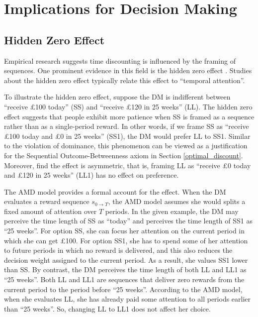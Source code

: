 \documentclass[
  12pt,
]{article}
\begin{document}
\hypertarget{implications-for-decision-making}{%
\section{Implications for Decision
Making}\label{implications-for-decision-making}}

\hypertarget{hidden-zero-effect}{%
\subsection{\texorpdfstring{Hidden Zero Effect
\label{hidden_zero_effect}}{Hidden Zero Effect }}\label{hidden-zero-effect}}

Empirical research suggests time discounting is influenced by the
framing of sequences. One prominent evidence in this field is the hidden
zero effect \citep{magen2008hidden, radu2011mechanism, read2017value}.
Studies about the hidden zero effect typically relate this effect to
``temporal attention''.

To illustrate the hidden zero effect, suppose the DM is indifferent
between ``receive £100 today'' (SS) and ``receive £120 in 25 weeks''
(LL). The hidden zero effect suggests that people exhibit more patience
when SS is framed as a sequence rather than as a single-period reward.
In other words, if we frame SS as ``receive £100 today and £0 in 25
weeks'' (SS1), the DM would prefer LL to SS1. Similar to the violation
of dominance, this phenomenon can be viewed as a justification for the
Sequential Outcome-Betweenness axiom in Section \ref{optimal_discount}.
Moreover, \citet{read2017value} find the effect is asymmetric, that is,
framing LL as ``receive £0 today and £120 in 25 weeks'' (LL1) has no
effect on preference.

The AMD model provides a formal account for the effect. When the DM
evaluates a reward sequence \(s_{0\rightarrow T}\), the AMD model
assumes she would splits a fixed amount of attention over \(T\) periods.
In the given example, the DM may perceive the time length of SS as
``today'' and perceives the time length of SS1 as ``25 weeks''. For
option SS, she can focus her attention on the current period in which
she can get £100. For option SS1, she has to spend some of her attention
to future periods in which no reward is delivered, and this also reduces
the decision weight assigned to the current period. As a result, she
values SS1 lower than SS. By contrast, the DM perceives the time length
of both LL and LL1 as ``25 weeks''. Both LL and LL1 are sequences that
deliver zero rewards from the current period to the period before ``25
weeks''. According to the AMD model, when she evaluates LL, she has
already paid some attention to all periods earlier than ``25 weeks''.
So, changing LL to LL1 does not affect her choice.
\end{document}
